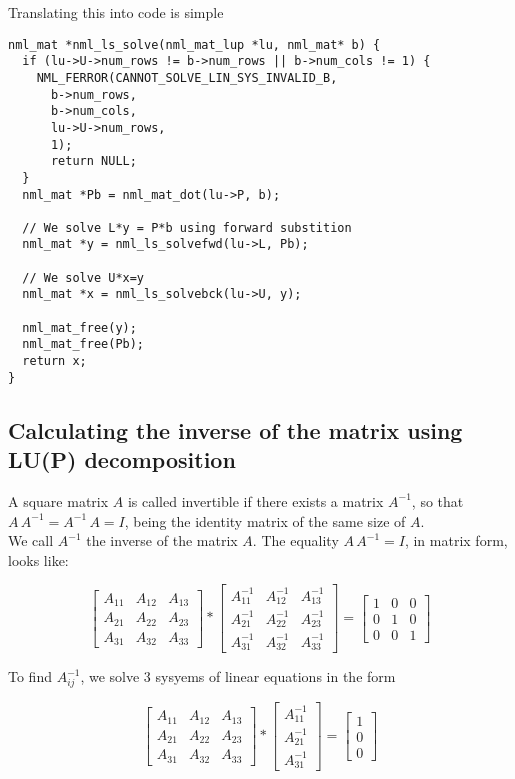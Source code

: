 Translating this into code is simple

\begin{verbatim}
nml_mat *nml_ls_solve(nml_mat_lup *lu, nml_mat* b) {
  if (lu->U->num_rows != b->num_rows || b->num_cols != 1) {
    NML_FERROR(CANNOT_SOLVE_LIN_SYS_INVALID_B,
      b->num_rows,
      b->num_cols,
      lu->U->num_rows,
      1);
      return NULL;
  }
  nml_mat *Pb = nml_mat_dot(lu->P, b);

  // We solve L*y = P*b using forward substition
  nml_mat *y = nml_ls_solvefwd(lu->L, Pb);

  // We solve U*x=y
  nml_mat *x = nml_ls_solvebck(lu->U, y);

  nml_mat_free(y);
  nml_mat_free(Pb);
  return x;
} 
\end{verbatim}

\subsection{Calculating the inverse of the matrix using LU(P) decomposition}

A square matrix $A$ is called invertible if there exists a matrix $A^{-1}$, so that $A\, A^{-1}=A^{-1}\, A = I$, being the identity matrix of the same size of $A$.
\\

We call $A^{-1}$ the inverse of the matrix $A$. The equality $A\, A^{-1} = I$, in matrix form, looks like:

$$
\begin{bmatrix}
A_{11} & A_{12} & A_{13} \\
A_{21} & A_{22} & A_{23} \\
A_{31} & A_{32} & A_{33}
\end{bmatrix}
*
\begin{bmatrix}
A_{11}^{-1} & A_{12}^{-1} & A_{13}^{-1} \\
A_{21}^{-1} & A_{22}^{-1} & A_{23}^{-1} \\
A_{31}^{-1} & A_{32}^{-1} & A_{33}^{-1}
\end{bmatrix}
=
\begin{bmatrix}
1 & 0 & 0 \\
0 & 1 & 0 \\
0 & 0 & 1
\end{bmatrix}
$$

To find $A_{ij}^{-1}$, we solve 3 sysyems of linear equations in the form

$$
\begin{bmatrix}
A_{11} & A_{12} & A_{13} \\
A_{21} & A_{22} & A_{23} \\
A_{31} & A_{32} & A_{33}
\end{bmatrix}
*
\begin{bmatrix}
A_{11}^{-1}  \\
A_{21}^{-1}  \\
A_{31}^{-1}
\end{bmatrix}
=
\begin{bmatrix}
1 \\
0 \\
0 
\end{bmatrix}
$$

